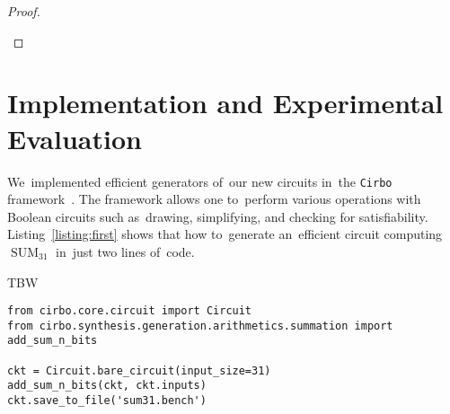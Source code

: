 \documentclass[sigconf, review, anonymous]{acmart}
\DeclareMathOperator{\SUM}{SUM}
\begin{document}
\begin{proof}
\begin{enumerate}
\begin{center}
        \end{center}
    \end{enumerate}
\end{proof}



\section{Implementation and Experimental Evaluation}
We~implemented efficient generators of~our new circuits in~the \texttt{Cirbo} framework~\cite{DBLP:journals/corr/abs-2412-14933}. The framework allows one
to~perform various operations with Boolean circuits such as~drawing, simplifying,
and checking for satisfiability.
Listing~\ref{listing:first} shows
that how to~generate an~efficient circuit computing $\SUM_{31}$ in~just two lines of~code.

\begin{listing}
	\caption{TBW}
	\label{listing:first}
	\begin{lstlisting}
from cirbo.core.circuit import Circuit
from cirbo.synthesis.generation.arithmetics.summation import add_sum_n_bits

ckt = Circuit.bare_circuit(input_size=31)
add_sum_n_bits(ckt, ckt.inputs)
ckt.save_to_file('sum31.bench')
	\end{lstlisting}
\end{listing}
\end{document}
